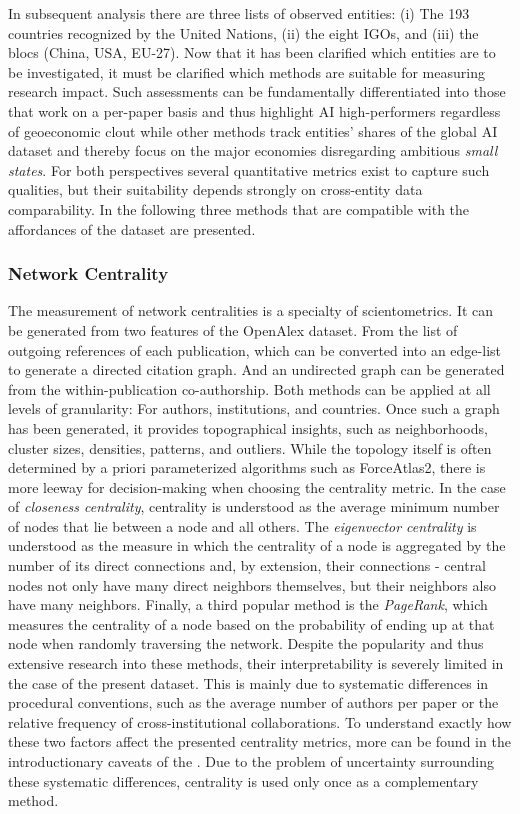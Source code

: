 \documentclass{article}
\begin{document}
	
	In subsequent analysis there are three lists of observed entities: (i) The 193 countries recognized by the United Nations, (ii) the eight IGOs, and (iii) the blocs (China, USA, EU-27). Now that it has been clarified which entities are to be investigated, it must be clarified which methods are suitable for measuring research impact. Such assessments can be fundamentally differentiated into those that work on a per-paper basis and thus highlight AI high-performers regardless of geoeconomic clout while other methods track entities' shares of the global AI dataset and thereby focus on the major economies disregarding ambitious \textit{small states}. For both perspectives several quantitative metrics exist to capture such qualities, but their suitability depends strongly on cross-entity data comparability. In the following three methods that are compatible with the affordances of the dataset are presented.
	
	\subsubsection{Network Centrality}
	\label{network_centrality}
	
	The measurement of network centralities is a specialty of scientometrics. It can be generated from two features of the OpenAlex dataset. From the list of outgoing references of each publication, which can be converted into an edge-list to generate a directed citation graph. And an undirected graph can be generated from the within-publication co-authorship. Both methods can be applied at all levels of granularity: For authors, institutions, and countries. Once such a graph has been generated, it provides topographical insights, such as neighborhoods, cluster sizes, densities, patterns, and outliers. While the topology itself is often determined by a priori parameterized algorithms such as ForceAtlas2, there is more leeway for decision-making when choosing the centrality metric. In the case of \textit{closeness centrality}, centrality is understood as the average minimum number of nodes that lie between a node and all others. The \textit{eigenvector centrality} is understood as the measure in which the centrality of a node is aggregated by the number of its direct connections and, by extension, their connections - central nodes not only have many direct neighbors themselves, but their neighbors also have many neighbors. Finally, a third popular method is the \textit{PageRank}, which measures the centrality of a node based on the probability of ending up at that node when randomly traversing the network. Despite the popularity and thus extensive research into these methods, their interpretability is severely limited in the case of the present dataset. This is mainly due to systematic differences in procedural conventions, such as the average number of authors per paper or the relative frequency of cross-institutional collaborations. To understand exactly how these two factors affect the presented centrality metrics, more can be found in the introductionary caveats of the . Due to the problem of uncertainty surrounding these systematic differences, centrality is used only once as a complementary method.
	
\end{document}
